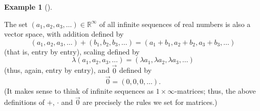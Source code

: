 \documentclass[numbers=enddot,12pt,final,onecolumn,notitlepage]{scrartcl}%
\theoremstyle{definition}
\newtheorem{exam}[theo]{Example}
\newenvironment{example}[1][]
{\begin{exam}[#1]\begin{leftbar}}
{\end{leftbar}\end{exam}}
\begin{document}
\begin{example}
\label{exam.vectspace.Rinf}The set $\left(  a_{1},a_{2},a_{3},\ldots\right)
\in\mathbb{R}^{\infty}$ of all infinite sequences of real numbers is also a
vector space, with addition defined by%
\[
\left(  a_{1},a_{2},a_{3},\ldots\right)  +\left(  b_{1},b_{2},b_{3}%
,\ldots\right)  =\left(  a_{1}+b_{1},a_{2}+b_{2},a_{3}+b_{3},\ldots\right)
\]
(that is, entry by entry), scaling defined by%
\[
\lambda\left(  a_{1},a_{2},a_{3},\ldots\right)  =\left(  \lambda a_{1},\lambda
a_{2},\lambda a_{3},\ldots\right)
\]
(thus, again, entry by entry), and $\overrightarrow{0}$ defined by%
\[
\overrightarrow{0}=\left(  0,0,0,\ldots\right)  .
\]
(It makes sense to think of infinite sequences as $1\times\infty$-matrices;
thus, the above definitions of $+$, $\cdot$ and $\overrightarrow{0}$ are
precisely the rules we set for matrices.)
\end{example}
\end{document}
